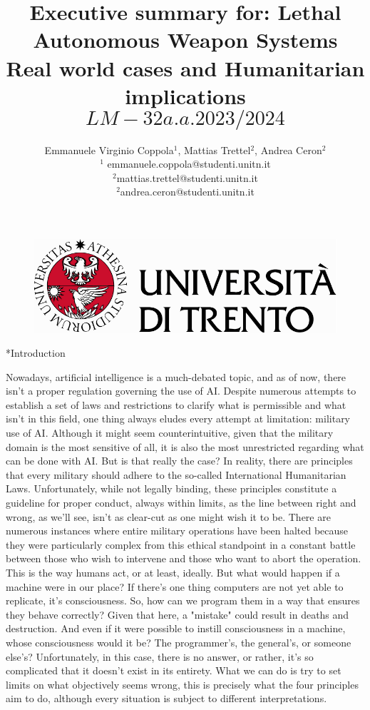 \documentclass[twocolumn, a4paper,10pt]{article}
\title{%
Executive summary for: Lethal Autonomous 
Weapon Systems\\																								%
\vspace{4pt}
Real world cases and Humanitarian implications \[LM-32 a.a. 2023/2024\]
} 																																%
\author{																																														%
Emmanuele Virginio Coppola$^1$, Mattias Trettel$^2$, Andrea Ceron$^2$\\ 																										%
$^1$ emmanuele.coppola@studenti.unitn.it\\ 																																	%
$^2$mattias.trettel@studenti.unitn.it\\
$^2$andrea.ceron@studenti.unitn.it\\
\phantom{Line 9}} 																																									%
\date{\vspace{-0.5cm}}	%
\makeatletter
\renewcommand\section{\@startsection{section}{1}{\z@}{3pt}{3pt}{\normalfont\large\bfseries}}
\makeatother
\begin{document}
\maketitle
\begin{figure}
  \centering

\includegraphics[scale=0.6]{img/Logo.pdf} 																																	%
\end{figure}
\section*{Introduction}	%
\addtocounter{section}{1}
Nowadays, artificial intelligence is a much-debated topic, and as of now, there isn't a proper regulation governing the use of AI. Despite numerous attempts to establish a set of laws and restrictions to clarify what is permissible and what isn't in this field, one thing always eludes every attempt at limitation: military use of AI. Although it might seem counterintuitive, given that the military domain is the most sensitive of all, it is also the most unrestricted regarding what can be done with AI. But is that really the case? In reality, there are principles that every military should adhere to the so-called International Humanitarian Laws. Unfortunately, while not legally binding, these principles constitute a guideline for proper conduct, always within limits, as the line between right and wrong, as we'll see, isn't as clear-cut as one might wish it to be. There are numerous instances where entire military operations have been halted because they were particularly complex from this ethical standpoint in a constant battle between those who wish to intervene and those who want to abort the operation. This is the way humans act, or at least, ideally. But what would happen if a machine were in our place? If there's one thing computers are not yet able to replicate, it's consciousness. So, how can we program them in a way that ensures they behave correctly? Given that here, a "mistake" could result in deaths and destruction. And even if it were possible to instill consciousness in a machine, whose consciousness would it be? The programmer's, the general's, or someone else's? Unfortunately, in this case, there is no answer, or rather, it's so complicated that it doesn't exist in its entirety. What we can do is try to set limits on what objectively seems wrong, this is precisely what the four principles aim to do, although every situation is subject to different interpretations.
\end{document}
